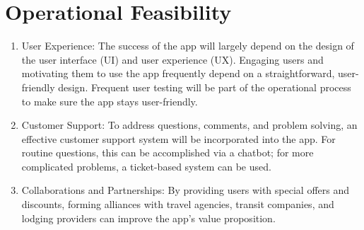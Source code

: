 \documentclass[12pt,a4paper]{report}
\begin{document}
\section{Operational Feasibility}
\begin{enumerate}

    \item User Experience: The success of the app will largely depend on the design of the user interface (UI) and user experience (UX). Engaging users and motivating them to use the app frequently depend on a straightforward, user-friendly design. Frequent user testing will be part of the operational process to make sure the app stays user-friendly.

    \item Customer Support: To address questions, comments, and problem solving, an effective customer support system will be incorporated into the app. For routine questions, this can be accomplished via a chatbot; for more complicated problems, a ticket-based system can be used.

    \item Collaborations and Partnerships: By providing users with special offers and discounts, forming alliances with travel agencies, transit companies, and lodging providers can improve the app's value proposition.
 
\end{enumerate}
\end{document}
